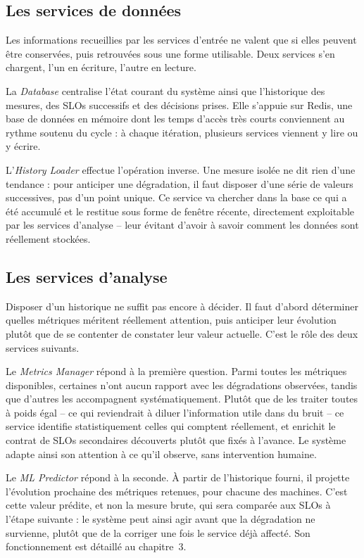 \subsection{Les services de données}
Les informations recueillies par les services d'entrée ne valent que si elles peuvent être conservées, puis retrouvées sous une forme utilisable. Deux services s'en chargent, l'un en écriture, l'autre en lecture.

La \emph{Database} centralise l'état courant du système ainsi que l'historique des mesures, des SLOs successifs et des décisions prises. Elle s'appuie sur Redis, une base de données en mémoire dont les temps d'accès très courts conviennent au rythme soutenu du cycle : à chaque itération, plusieurs services viennent y lire ou y écrire.

L'\emph{History Loader} effectue l'opération inverse. Une mesure isolée ne dit rien d'une tendance : pour anticiper une dégradation, il faut disposer d'une série de valeurs successives, pas d'un point unique. Ce service va chercher dans la base ce qui a été accumulé et le restitue sous forme de fenêtre récente, directement exploitable par les services d'analyse -- leur évitant d'avoir à savoir comment les données sont réellement stockées.

\subsection{Les services d'analyse}
Disposer d'un historique ne suffit pas encore à décider. Il faut d'abord déterminer quelles métriques méritent réellement attention, puis anticiper leur évolution plutôt que de se contenter de constater leur valeur actuelle. C'est le rôle des deux services suivants.

Le \emph{Metrics Manager} répond à la première question. Parmi toutes les métriques disponibles, certaines n'ont aucun rapport avec les dégradations observées, tandis que d'autres les accompagnent systématiquement. Plutôt que de les traiter toutes à poids égal -- ce qui reviendrait à diluer l'information utile dans du bruit -- ce service identifie statistiquement celles qui comptent réellement, et enrichit le contrat de SLOs secondaires découverts plutôt que fixés à l'avance. Le système adapte ainsi son attention à ce qu'il observe, sans intervention humaine.

Le \emph{ML Predictor} répond à la seconde. À partir de l'historique fourni, il projette l'évolution prochaine des métriques retenues, pour chacune des machines. C'est cette valeur prédite, et non la mesure brute, qui sera comparée aux SLOs à l'étape suivante : le système peut ainsi agir avant que la dégradation ne survienne, plutôt que de la corriger une fois le service déjà affecté. Son fonctionnement est détaillé au chapitre~3.

